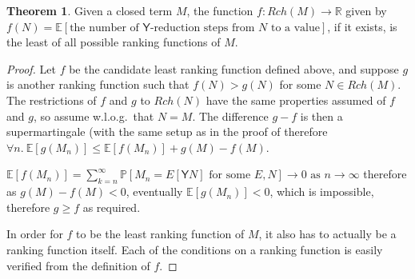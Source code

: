 \documentclass{article}
\newcommand{\tY}{\mathsf{Y}}
\theoremstyle{definition}
\theoremstyle{lemma}
\newtheorem{theorem}{Theorem}
\theoremstyle{remark}
\begin{document}
\begin{theorem} \label{thm:minimal}
Given a closed term $M$, the function $f:Rch(M) \to \mathbb R$ given by $f(N) = \mathbb E [\text{the number of }\tY\text{-reduction steps from }N\text{ to a value}]$, if it exists, is the least of all possible ranking functions of $M$.
\end{theorem}
\begin{proof}
Let $f$ be the candidate least ranking function defined above, and suppose $g$ is another ranking function such that $f(N) > g(N)$ for some $N \in Rch(M)$. The restrictions of $f$ and $g$ to $Rch(N)$ have the same properties assumed of $f$ and $g$, so assume w.l.o.g.~that $N=M$. The difference $g - f$ is then a supermartingale (with the same setup as in the proof of 
therefore $\forall n.\ \mathbb E[g(M_n)] \leq \mathbb E[f(M_n)] + g(M)-f(M)$.

$\mathbb E[f(M_n)] = \sum_{k=n}^\infty \mathbb P[M_n = E[\tY N] \text{ for some }E, N] \to 0 \text{ as } n \to \infty$ therefore as $g(M) - f(M) < 0$, eventually $\mathbb E[g(M_n)] < 0$, which is impossible, therefore $g \geq f$ as required.

In order for $f$ to be the least ranking function of $M$, it also has to actually be a ranking function itself. Each of the conditions on a ranking function is easily verified from the definition of $f$.
\end{proof}
\end{document}
